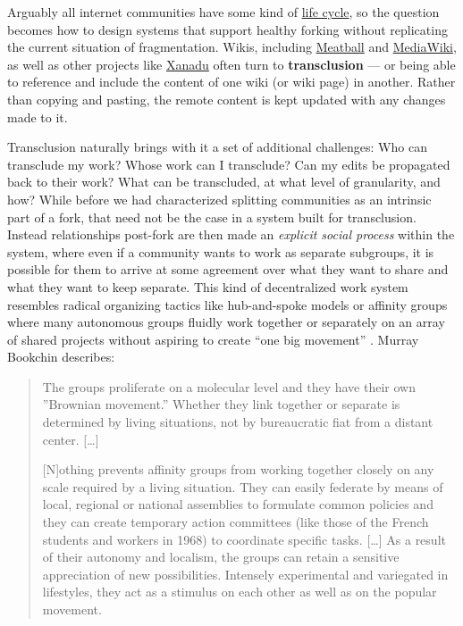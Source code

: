 \documentclass[10pt]{tufte-book}
\begin{document}
Arguably all internet communities have some kind of
\href{http://meatballwiki.org/wiki/WikiLifeCycle}{life cycle}, so the
question becomes how to design systems that support healthy forking
without replicating the current situation of fragmentation. Wikis,
including \href{http://www.meatballwiki.org/wiki/TransClusion}{Meatball}
and
\href{https://www.mediawiki.org/wiki/Extension:Interwiki}{MediaWiki}, as
well as other projects like
\href{https://en.wikipedia.org/wiki/Project_Xanadu}{Xanadu} often turn
to \textbf{transclusion} --- or being able to reference and include the
content of one wiki (or wiki page) in another. Rather than copying and
pasting, the remote content is kept updated with any changes made to it.

Transclusion naturally brings with it a set of additional challenges:
Who can transclude my work? Whose work can I transclude? Can my edits be
propagated back to their work? What can be transcluded, at what level of
granularity, and how? While before we had characterized splitting
communities as an intrinsic part of a fork, that need not be the case in
a system built for transclusion. Instead relationships post-fork are
then made an \emph{explicit social process} within the system, where
even if a community wants to work as separate subgroups, it is possible
for them to arrive at some agreement over what they want to share and
what they want to keep separate. This kind of decentralized work system
resembles radical organizing tactics like hub-and-spoke models or
affinity groups where many autonomous groups fluidly work together or
separately on an array of shared projects without aspiring to create
``one big movement'' \citep{kleinWereDCSeattle2001} . Murray
Bookchin describes:

\begin{quote}
The groups proliferate on a molecular level and they have their own
''Brownian movement.'' Whether they link together or separate is
determined by living situations, not by bureaucratic fiat from a distant
center. {[}\ldots{]}

{[}N{]}othing prevents affinity groups from working together closely on
any scale required by a living situation. They can easily federate by
means of local, regional or national assemblies to formulate common
policies and they can create temporary action committees (like those of
the French students and workers in 1968) to coordinate specific tasks.
{[}\ldots{]} As a result of their autonomy and localism, the groups can
retain a sensitive appreciation of new possibilities. Intensely
experimental and variegated in lifestyles, they act as a stimulus on
each other as well as on the popular movement. \citep{bookchinNoteAffinityGroups1969} 
\end{quote}
\end{document}

